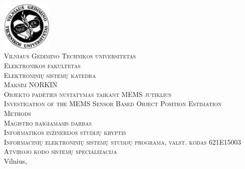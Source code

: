 \documentclass[]{vgtuef}
\begin{document}
  \begin{titlepage}
    \begin{center}
      \includegraphics[width=70pt]{img/vgtu_logo.png}\\
      \textsc{\LARGE Vilniaus Gedimino Technikos universitetas}\\[1mm]
      \textsc{\Large Elektronikos fakultetas}\\[1mm]
      \textsc{\Large Elektroninių sistemų katedra}\\[40mm]
      \textsc{\Large Maksim NORKIN}\\[1mm]
      \textsc{\Large Objekto padėties nustatymas taikant MEMS jutiklius}\\[15mm]
      \textsc{\Large Investigation of the MEMS Sensor Based Object Position Estimation Methods}\\[10mm]
      \textsc{\large Magistro baigiamasis darbas}\\[10mm]
      \textsc{Informatikos inžinerijos studijų kryptis}\\
      \textsc{Informacinių elektroninių sistemų studijų programa, valst. kodas 621E15003}\\
      \textsc{Atvirojo kodo sistemų specializacija}\\
      \vfill
      {\large Vilnius, \the\year}
    \end{center}
  \end{titlepage}
\end{document}
